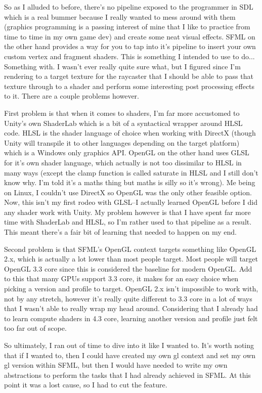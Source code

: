 \documentclass{article}
\begin{document}
So as I alluded to before, there's no pipeline exposed to the programmer in SDL
which is a real bummer because I really wanted to mess around with them
(graphics programming is a passing interest of mine that I like to practice
from time to time in my own game dev) and create some neat visual effects. SFML
on the other hand provides a way for you to tap into it's pipeline to insert
your own custom vertex and fragment shaders. This is something I intended to
use to do... Something with. I wasn't ever really quite sure what, but I figured
since I'm rendering to a target texture for the raycaster that I should be able
to pass that texture through to a shader and perform some interesting post
processing effects to it. There are a couple problems however.

First problem is that when it comes to shaders, I'm far more accustomed to
Unity's own ShaderLab which is a bit of a syntactical wrapper around HLSL code.
HLSL is the shader language of choice when working with DirectX (though Unity
will transpile it to other languages depending on the target platform) which is
a Windows only graphics API. OpenGL on the other hand uses GLSL for it's own
shader language, which actually is not too dissimilar to HLSL in many ways
(except the clamp function is called saturate in HLSL and I still don't know
why. I'm told it's a maths thing but maths is silly so it's wrong). Me being on
Linux, I couldn't use DirectX so OpenGL was the only other feasible option. Now,
this isn't my first rodeo with GLSL--I actually learned OpenGL before I did any
shader work with Unity. My problem however is that I have spent far more time
with ShaderLab and HLSL, so I'm rather used to that pipeline as a result. This
meant there's a fair bit of learning that needed to happen on my end.

Second problem is that SFML's OpenGL context targets something like OpenGL 2.x,
which is actually a lot lower than most people target. Most people will target
OpenGL 3.3 core since this is considered the baseline for modern OpenGL. Add to
this that many GPUs support 3.3 core, it makes for an easy choice when picking
a version and profile to target. OpenGL 2.x isn't impossible to work with, not
by any stretch, however it's really quite different to 3.3 core in a lot of ways
that I wasn't able to really wrap my head around. Considering that I already had
to learn compute shaders in 4.3 core, learning another version and profile just
felt too far out of scope.

So ultimately, I ran out of time to dive into it like I wanted to. It's worth
noting that if I wanted to, then I could have created my own gl context and set
my own gl version within SFML, but then I would have needed to write my own
abstractions to perform the tasks that I had already achieved in SFML. At this
point it was a lost cause, so I had to cut the feature.
\end{document}
